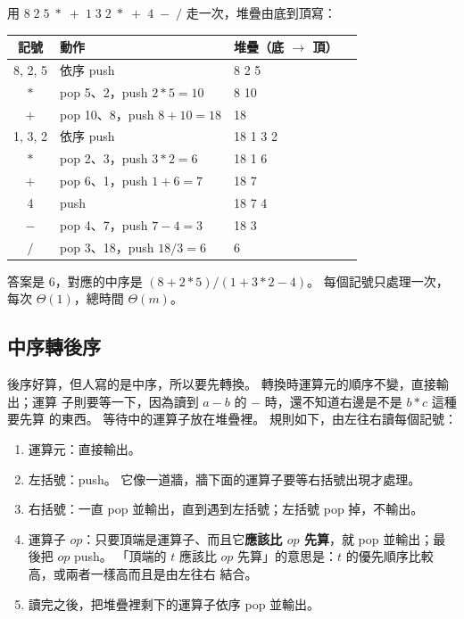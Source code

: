 用 $8\;2\;5\;*\;+\;1\;3\;2\;*\;+\;4\;-\;/$ 走一次，堆疊由底到頂寫：

\begin{center}
\begin{tabular}{clll}
\toprule
記號 & 動作 & 堆疊（底 $\to$ 頂）\\
\midrule
8, 2, 5 & 依序 push & 8 2 5 \\
$*$ & pop 5、2，push $2 * 5 = 10$ & 8 10 \\
$+$ & pop 10、8，push $8 + 10 = 18$ & 18 \\
1, 3, 2 & 依序 push & 18 1 3 2 \\
$*$ & pop 2、3，push $3 * 2 = 6$ & 18 1 6 \\
$+$ & pop 6、1，push $1 + 6 = 7$ & 18 7 \\
4 & push & 18 7 4 \\
$-$ & pop 4、7，push $7 - 4 = 3$ & 18 3 \\
$/$ & pop 3、18，push $18 / 3 = 6$ & 6 \\
\bottomrule
\end{tabular}
\end{center}

答案是 $6$，對應的中序是 $(8 + 2 * 5) / (1 + 3 * 2 - 4)$。 每個記號只處理一次，
每次 $\Theta(1)$，總時間 $\Theta(m)$。

\subsection{中序轉後序}
\label{sec:sq-infix-postfix}

後序好算，但人寫的是中序，所以要先轉換。 轉換時運算元的順序不變，直接輸出；運算
子則要等一下，因為讀到 $a - b$ 的 $-$ 時，還不知道右邊是不是 $b * c$ 這種要先算
的東西。 等待中的運算子放在堆疊裡。 規則如下，由左往右讀每個記號：

\begin{enumerate}
\item 運算元：直接輸出。
\item 左括號：push。 它像一道牆，牆下面的運算子要等右括號出現才處理。
\item 右括號：一直 pop 並輸出，直到遇到左括號；左括號 pop 掉，不輸出。
\item 運算子 $\mathit{op}$：只要頂端是運算子、而且它\textbf{應該比 $\mathit{op}$
先算}，就 pop 並輸出；最後把 $\mathit{op}$ push。 「頂端的 $t$ 應該比
$\mathit{op}$ 先算」的意思是：$t$ 的優先順序比較高，或兩者一樣高而且是由左往右
結合。
\item 讀完之後，把堆疊裡剩下的運算子依序 pop 並輸出。
\end{enumerate}

